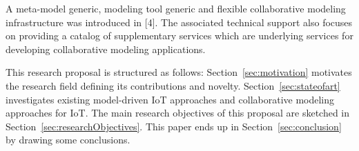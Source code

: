 A meta-model generic, modeling tool generic and flexible collaborative modeling infrastructure was introduced in [4]. The associated technical support also focuses on providing a catalog of supplementary services which are underlying services for developing collaborative modeling applications.

This research proposal is structured as follows: Section~\ref{sec:motivation} motivates the research field defining its contributions and novelty. Section~\ref{sec:stateofart} investigates existing model-driven IoT approaches and collaborative modeling approaches for IoT. The main research objectives of this proposal are sketched in Section~\ref{sec:researchObjectives}. This paper ends up in Section~\ref{sec:conclusion} by drawing some conclusions.